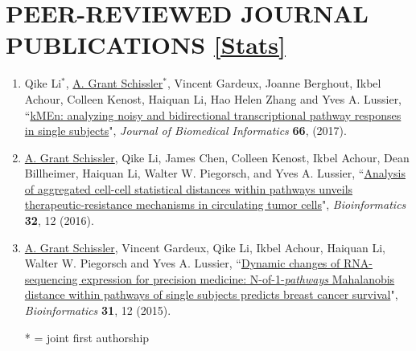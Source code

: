 \documentclass[paper=a4,fontsize=11pt]{scrartcl} %
\newcommand{\NewPart}[2]{\section*{\uppercase{#1} #2 }}
\newcommand{\PaperEntry}[7]{
		\noindent #1, ``\href{#7}{#2}", \textit{#3} \textbf{#4}, #5 (#6).}
\begin{document}

\NewPart{Peer-Reviewed Journal Publications}{\href{https://scholar.google.com/citations?user=1H-SHoMAAAAJ&hl=en}{[Stats]}}
\vspace{-7pt}
\begin{enumerate}

\item \PaperEntry{Qike Li$^{*}$, \underline{A. Grant Schissler}$^{*}$, Vincent Gardeux, Joanne Berghout, Ikbel Achour, Colleen Kenost, Haiquan Li, Hao Helen Zhang and Yves A. Lussier}{kMEn: analyzing noisy and bidirectional transcriptional pathway responses in single subjects}{Journal of Biomedical Informatics}{66}{}{2017}{http://www.sciencedirect.com/science/article/pii/S1532046416301836}

\item \PaperEntry{\underline{A. Grant Schissler}, Qike Li, James Chen, Colleen Kenost, Ikbel Achour, Dean Billheimer, Haiquan Li, Walter W. Piegorsch, and Yves A. Lussier}{Analysis of aggregated cell-cell statistical distances within pathways unveils therapeutic-resistance mechanisms in circulating tumor cells}{Bioinformatics}{32}{12}{2016}{http://bioinformatics.oxfordjournals.org/content/32/12/i80.full}

\item \PaperEntry{\underline{A. Grant Schissler}, Vincent Gardeux, Qike Li, Ikbel Achour, Haiquan Li, Walter W. Piegorsch and Yves A. Lussier}{Dynamic changes of RNA-sequencing expression for precision medicine: N-of-1-\textit{pathways} Mahalanobis distance within pathways of single subjects predicts breast cancer survival}{Bioinformatics}{31}{12}{2015}{http://bioinformatics.oxfordjournals.org/content/31/12/i293.full}

  * = joint first authorship
\end{enumerate}

\end{document}
